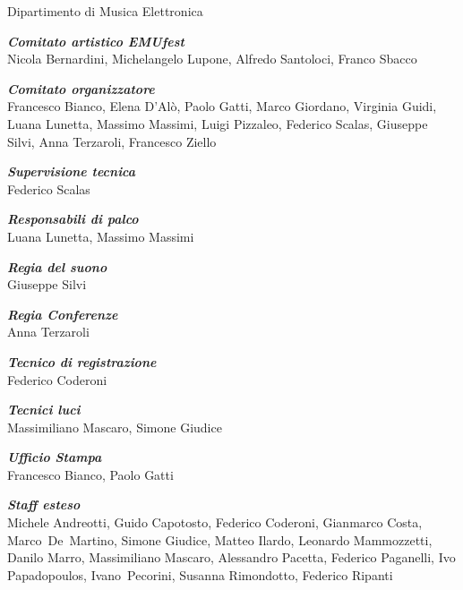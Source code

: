 \documentclass[8pt, twoside, a5paper]{extreport}
\begin{document}
\begin{center}

{\fontsize{30}{30} }
\medskip

{\fontsize{12}{12} \textsf{Dipartimento di Musica Elettronica}}\\
\vspace{.5cm}

\textbf{\textit{Comitato artistico EMUfest}}\\
Nicola Bernardini, Michelangelo Lupone, Alfredo Santoloci, Franco Sbacco
\medskip

\textbf{\textit{Comitato organizzatore}}\\
Francesco Bianco, Elena D'Alò, Paolo Gatti, Marco Giordano, Virginia Guidi, Luana Lunetta, Massimo Massimi, 	Luigi Pizzaleo, Federico Scalas, Giuseppe Silvi, Anna Terzaroli, Francesco Ziello
\medskip

\textbf{\textit{Supervisione tecnica}}\\
Federico Scalas
\medskip

\textbf{\textit{Responsabili di palco}}\\
Luana Lunetta, Massimo Massimi
\medskip

\textbf{\textit{Regia del suono}}\\
Giuseppe Silvi
\medskip

\textbf{\textit{Regia Conferenze}}\\
Anna Terzaroli
\medskip

\textbf{\textit{Tecnico di registrazione}}\\
Federico Coderoni
\medskip

\textbf{\textit{Tecnici luci}}\\
Massimiliano Mascaro, Simone Giudice
\medskip

\textbf{\textit{Ufficio Stampa}}\\
Francesco Bianco, Paolo Gatti
\medskip

\textbf{\textit{Staff esteso}}\\
Michele Andreotti, Guido Capotosto, Federico Coderoni, Gianmarco Costa,
Marco~De~Martino, Simone Giudice, Matteo Ilardo, Leonardo Mammozzetti,
Danilo Marro, Massimiliano Mascaro, Alessandro Pacetta,
Federico Paganelli, Ivo Papadopoulos, Ivano~Pecorini, Susanna Rimondotto, Federico Ripanti
\end{center}


\end{document}
